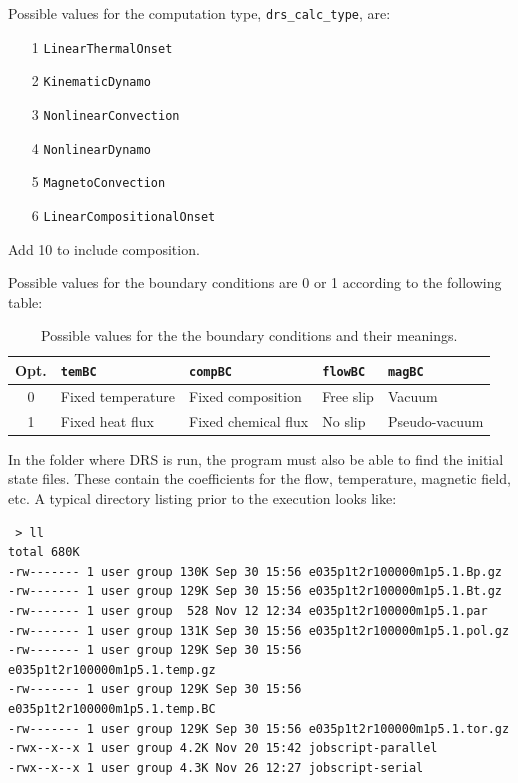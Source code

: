 \documentclass[a4paper,10pt]{book}
\begin{document}
Possible values for the computation type, \verb|drs_calc_type|, are:
\begin{itemize}
\item[1] \verb|LinearThermalOnset|
\item[2] \verb|KinematicDynamo|
\item[3] \verb|NonlinearConvection|
\item[4] \verb|NonlinearDynamo|
\item[5] \verb|MagnetoConvection|
\item[6] \verb|LinearCompositionalOnset|
\end{itemize}
Add 10 to include composition.

Possible values for the boundary conditions are 0 or 1 according to the following
table:
\begin{table}[htb]
\begin{tabular}{c|l|l|l|l}
Opt. & \verb|temBC|      & \verb|compBC|       & \verb|flowBC| & \verb|magBC|  \\ \hline
0     & Fixed temperature & Fixed composition   & Free slip     & Vacuum        \\
1     & Fixed heat flux   & Fixed chemical flux & No slip       & Pseudo-vacuum \\
\end{tabular}
\caption{Possible values for the the boundary conditions and their meanings.}
\end{table}

In the folder where DRS is run, the program must also be able to find the
initial state files. These contain the coefficients for the flow, temperature,
magnetic field, etc. A typical directory listing prior to the execution looks
like:
\begin{small}
\begin{verbatim}
 > ll
total 680K
-rw------- 1 user group 130K Sep 30 15:56 e035p1t2r100000m1p5.1.Bp.gz
-rw------- 1 user group 129K Sep 30 15:56 e035p1t2r100000m1p5.1.Bt.gz
-rw------- 1 user group  528 Nov 12 12:34 e035p1t2r100000m1p5.1.par
-rw------- 1 user group 131K Sep 30 15:56 e035p1t2r100000m1p5.1.pol.gz
-rw------- 1 user group 129K Sep 30 15:56 e035p1t2r100000m1p5.1.temp.gz
-rw------- 1 user group 129K Sep 30 15:56 e035p1t2r100000m1p5.1.temp.BC
-rw------- 1 user group 129K Sep 30 15:56 e035p1t2r100000m1p5.1.tor.gz
-rwx--x--x 1 user group 4.2K Nov 20 15:42 jobscript-parallel
-rwx--x--x 1 user group 4.3K Nov 26 12:27 jobscript-serial
\end{verbatim}
\end{small}
\end{document}
